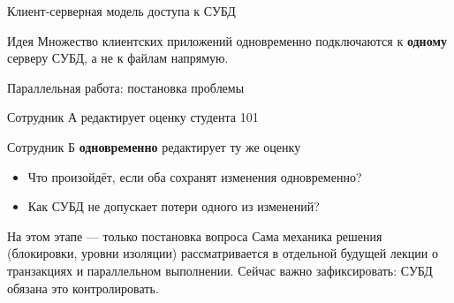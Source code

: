 \documentclass[aspectratio=169]{beamer}
\begin{document}
\begin{frame}{Клиент-серверная модель доступа к СУБД}

\begin{center}
\end{center}

\begin{alertblock}{Идея}
Множество клиентских приложений одновременно подключаются
к \textbf{одному} серверу СУБД, а не к файлам напрямую.
\end{alertblock}

\end{frame}


\begin{frame}{Параллельная работа: постановка проблемы}

\begin{center}
\large
Сотрудник А редактирует оценку студента 101
\end{center}
\begin{center}
\large
Сотрудник Б \textbf{одновременно} редактирует ту же оценку
\end{center}

\vspace{0.4cm}

\begin{itemize}
  \item Что произойдёт, если оба сохранят изменения
        одновременно?
  \item Как СУБД не допускает потери одного из изменений?
\end{itemize}

\vspace{0.3cm}

\begin{alertblock}{На этом этапе — только постановка вопроса}
Сама механика решения (блокировки, уровни изоляции)
рассматривается в отдельной будущей лекции
о транзакциях и параллельном выполнении.
Сейчас важно зафиксировать: СУБД обязана
это контролировать.
\end{alertblock}

\end{frame}
\end{document}
